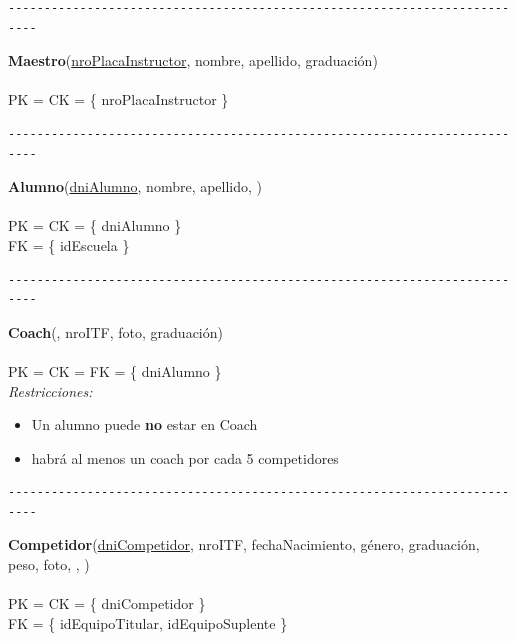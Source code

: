 \begin{verbatim}
--------------------------------------------------------------------------
\end{verbatim}

\noindent\textbf{Maestro}(\uline{nroPlacaInstructor}, nombre, apellido, graduación)
\\
\\
PK = CK = \{ nroPlacaInstructor \} \\


\begin{verbatim}
--------------------------------------------------------------------------
\end{verbatim}

\noindent\textbf{Alumno}(\uline{dniAlumno}, nombre, apellido, )
\\
\\
PK = CK = \{ dniAlumno \} \\
FK = \{ idEscuela \} \\


\begin{verbatim}
--------------------------------------------------------------------------
\end{verbatim}

\noindent\textbf{Coach}(, nroITF, foto, graduación)
\\
\\
PK = CK = FK = \{ dniAlumno \} \\

\textit{Restricciones:}
\begin{itemize}
	\item Un alumno puede \textbf{no} estar en Coach
	\item habrá al menos un coach por cada 5 competidores
\end{itemize}


\begin{verbatim}
--------------------------------------------------------------------------
\end{verbatim}

\noindent\textbf{Competidor}(\uline{dniCompetidor}, nroITF, fechaNacimiento, género, graduación, peso, foto, , )
\\
\\
PK = CK = \{ dniCompetidor \} \\
FK = \{ idEquipoTitular, idEquipoSuplente \} \\


